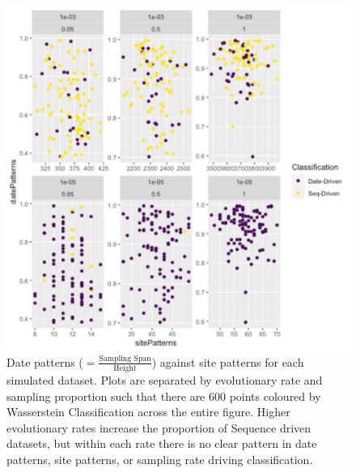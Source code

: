 \documentclass{article}
\begin{document}
\begin{figure}[H]
\centering
\includegraphics[width=1\linewidth]{../figures/patternsClass.pdf}
\caption{Date patterns ($=\frac{\text{Sampling Span}}{\text{Height}}$) against site patterns for each simulated dataset. Plots are separated by evolutionary rate and sampling proportion such that there are 600 points coloured by Wasserstein Classification across the entire figure. Higher evolutionary rates increase the proportion of Sequence driven datasets, but within each rate there is no clear pattern in date patterns, site patterns, or sampling rate driving classification.}
\label{fig:patterns}
\end{figure}
\end{document}
